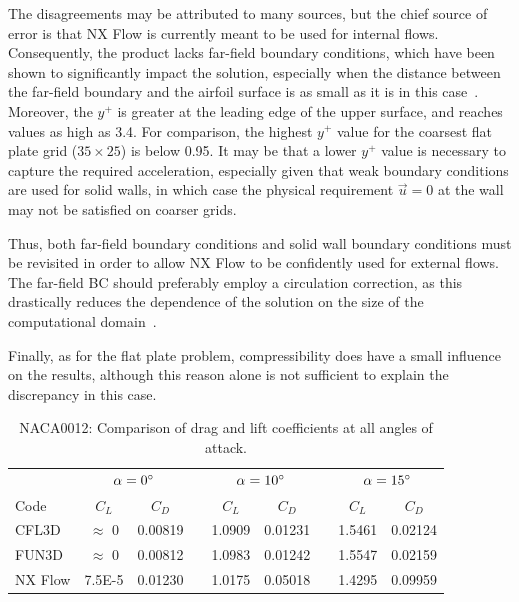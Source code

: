 The disagreements may be attributed to many sources, but the chief source of error is that NX Flow is currently meant to be used for internal flows. Consequently, the product lacks far-field boundary conditions, which have been shown to significantly impact the solution, especially when the distance between the far-field boundary and the airfoil surface is as small as it is in this case~\cite{tmrvortex,thomas1986far}. Moreover, the $y^+$ is greater at the leading edge of the upper surface, and reaches values as high as 3.4. For comparison, the highest $y^+$ value for the coarsest flat plate grid ($35\times25$) is below 0.95. It may be that a lower $y^+$ value is necessary to capture the required acceleration, especially given that weak boundary conditions are used for solid walls, in which case the physical requirement $\vec{u} = 0$ at the wall may not be satisfied on coarser grids.

Thus, both far-field boundary conditions and solid wall boundary conditions must be revisited in order to allow NX Flow to be confidently used for external flows. The far-field BC should preferably employ a circulation correction, as this drastically reduces the dependence of the solution on the size of the computational domain~\cite{tmrvortex}.

Finally, as for the flat plate problem, compressibility does have a small influence on the results, although this reason alone is not sufficient to explain the discrepancy in this case.
\begin{table}
    \centering
    \caption{NACA0012: Comparison of drag and lift coefficients at all angles of attack.}
    \label{tab:naca0012}
    \begin{tabular}{@{}l cc c cc c cc@{}}
        \toprule
         & \multicolumn{2}{c}{$\alpha = 0^\circ$} & \phantom{a}
            & \multicolumn{2}{c}{$\alpha = 10^\circ$} & \phantom{a}
            & \multicolumn{2}{c}{$\alpha = 15^\circ$}\\
        \cline{2-3} \cline{5-6} \cline{8-9}
        Code & $C_L$ & $C_D$ && $C_L$ & $C_D$ && $C_L$ & $C_D$ \\
        \midrule
        CFL3D & $\approx$ 0 & 0.00819 && 1.0909 & 0.01231 && 1.5461 & 0.02124 \\
        FUN3D & $\approx$ 0 & 0.00812 && 1.0983 & 0.01242 && 1.5547 & 0.02159 \\
        NX Flow & 7.5E-5    & 0.01230 && 1.0175 & 0.05018 && 1.4295 & 0.09959 \\
        \bottomrule
    \end{tabular}
\end{table}

